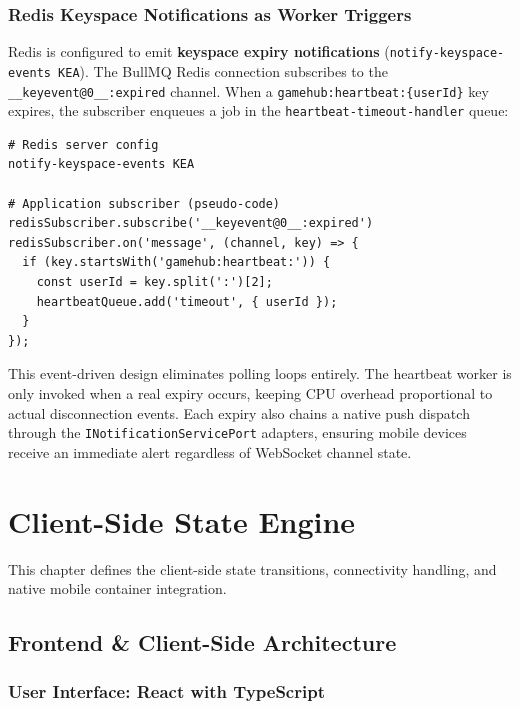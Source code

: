 \documentclass[11pt,a4paper]{report}
\begin{document}
\subsection{Redis Keyspace Notifications as Worker Triggers}

Redis is configured to emit \textbf{keyspace expiry notifications} (\texttt{notify-keyspace-events KEA}). The BullMQ Redis connection subscribes to the \texttt{\_\_keyevent@0\_\_:expired} channel. When a \texttt{gamehub:heartbeat:\{userId\}} key expires, the subscriber enqueues a job in the \texttt{heartbeat-timeout-handler} queue:

\begin{lstlisting}[caption={Redis keyspace notification subscriber}]
# Redis server config
notify-keyspace-events KEA

# Application subscriber (pseudo-code)
redisSubscriber.subscribe('__keyevent@0__:expired')
redisSubscriber.on('message', (channel, key) => {
  if (key.startsWith('gamehub:heartbeat:')) {
    const userId = key.split(':')[2];
    heartbeatQueue.add('timeout', { userId });
  }
});
\end{lstlisting}

This event-driven design eliminates polling loops entirely. The heartbeat worker is only invoked when a real expiry occurs, keeping CPU overhead proportional to actual disconnection events. Each expiry also chains a native push dispatch through the \texttt{INotificationServicePort} adapters, ensuring mobile devices receive an immediate alert regardless of WebSocket channel state.


\chapter{Client-Side State Engine}

This chapter defines the client-side state transitions, connectivity handling, and native mobile container integration.

\section{Frontend \& Client-Side Architecture}

\subsection{User Interface: React with TypeScript}
\end{document}
